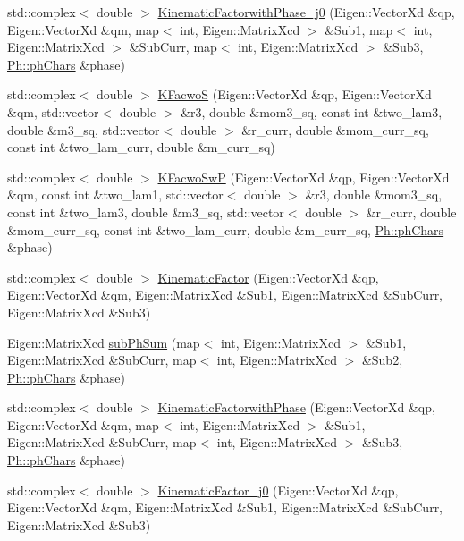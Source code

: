 \begin{DoxyCompactItemize}
\item 
std\+::complex$<$ double $>$ \mbox{\hyperlink{namespaceKFac_a87a5304db9d4c659637da23e363cf4a4}{Kinematic\+Factorwith\+Phase\+\_\+j0}} (Eigen\+::\+Vector\+Xd \&qp, Eigen\+::\+Vector\+Xd \&qm, map$<$ int, Eigen\+::\+Matrix\+Xcd $>$ \&Sub1, map$<$ int, Eigen\+::\+Matrix\+Xcd $>$ \&Sub\+Curr, map$<$ int, Eigen\+::\+Matrix\+Xcd $>$ \&Sub3, \mbox{\hyperlink{structPh_1_1phChars}{Ph\+::ph\+Chars}} \&phase)
\item 
std\+::complex$<$ double $>$ \mbox{\hyperlink{namespaceKFac_a2f18ad8b36ac24cc9534755cccb8c780}{K\+FacwoS}} (Eigen\+::\+Vector\+Xd \&qp, Eigen\+::\+Vector\+Xd \&qm, std\+::vector$<$ double $>$ \&r3, double \&mom3\+\_\+sq, const int \&two\+\_\+lam3, double \&m3\+\_\+sq, std\+::vector$<$ double $>$ \&r\+\_\+curr, double \&mom\+\_\+curr\+\_\+sq, const int \&two\+\_\+lam\+\_\+curr, double \&m\+\_\+curr\+\_\+sq)
\item 
std\+::complex$<$ double $>$ \mbox{\hyperlink{namespaceKFac_a2ae9d69821729f6946651703e8990e58}{K\+Facwo\+SwP}} (Eigen\+::\+Vector\+Xd \&qp, Eigen\+::\+Vector\+Xd \&qm, const int \&two\+\_\+lam1, std\+::vector$<$ double $>$ \&r3, double \&mom3\+\_\+sq, const int \&two\+\_\+lam3, double \&m3\+\_\+sq, std\+::vector$<$ double $>$ \&r\+\_\+curr, double \&mom\+\_\+curr\+\_\+sq, const int \&two\+\_\+lam\+\_\+curr, double \&m\+\_\+curr\+\_\+sq, \mbox{\hyperlink{structPh_1_1phChars}{Ph\+::ph\+Chars}} \&phase)
\item 
std\+::complex$<$ double $>$ \mbox{\hyperlink{namespaceKFac_a56130e258872427e83c530a5a471cf5c}{Kinematic\+Factor}} (Eigen\+::\+Vector\+Xd \&qp, Eigen\+::\+Vector\+Xd \&qm, Eigen\+::\+Matrix\+Xcd \&Sub1, Eigen\+::\+Matrix\+Xcd \&Sub\+Curr, Eigen\+::\+Matrix\+Xcd \&Sub3)
\item 
Eigen\+::\+Matrix\+Xcd \mbox{\hyperlink{namespaceKFac_a87e82af0cfc26fdde23953fb315dc9d5}{sub\+Ph\+Sum}} (map$<$ int, Eigen\+::\+Matrix\+Xcd $>$ \&Sub1, Eigen\+::\+Matrix\+Xcd \&Sub\+Curr, map$<$ int, Eigen\+::\+Matrix\+Xcd $>$ \&Sub2, \mbox{\hyperlink{structPh_1_1phChars}{Ph\+::ph\+Chars}} \&phase)
\item 
std\+::complex$<$ double $>$ \mbox{\hyperlink{namespaceKFac_a5fe5ea6a5ab8c5c87ca764f254396434}{Kinematic\+Factorwith\+Phase}} (Eigen\+::\+Vector\+Xd \&qp, Eigen\+::\+Vector\+Xd \&qm, map$<$ int, Eigen\+::\+Matrix\+Xcd $>$ \&Sub1, Eigen\+::\+Matrix\+Xcd \&Sub\+Curr, map$<$ int, Eigen\+::\+Matrix\+Xcd $>$ \&Sub3, \mbox{\hyperlink{structPh_1_1phChars}{Ph\+::ph\+Chars}} \&phase)
\item 
std\+::complex$<$ double $>$ \mbox{\hyperlink{namespaceKFac_a6f8f443ade2532c958e4dc168d7da1c7}{Kinematic\+Factor\+\_\+j0}} (Eigen\+::\+Vector\+Xd \&qp, Eigen\+::\+Vector\+Xd \&qm, Eigen\+::\+Matrix\+Xcd \&Sub1, Eigen\+::\+Matrix\+Xcd \&Sub\+Curr, Eigen\+::\+Matrix\+Xcd \&Sub3)

\end{DoxyCompactItemize}
